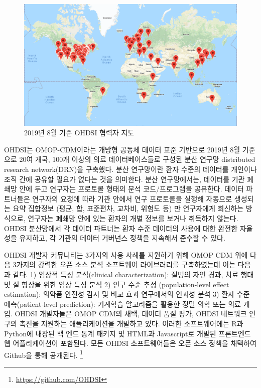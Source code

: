 \documentclass[11pt]{book}
\let\rmarkdownfootnote\footnote%
\def\footnote{\protect\rmarkdownfootnote}
\theoremstyle{definition}
\theoremstyle{definition}
\theoremstyle{definition}
\theoremstyle{remark}
\begin{document}
\begin{figure}

{\centering \includegraphics[width=1\linewidth]{images/OhdsiCommunity/mapOfCollaborators} 

}

\caption{2019년 8월 기준 OHDSI 협력자 지도}\label{fig:collaboratormap}
\end{figure}

OHDSI는 OMOP-CDM이라는 개방형 공동체 데이터 표준 기반으로 2019년 8월
기준으로 20여 개국, 100개 이상의 의료 데이터베이스들로 구성된 분산
연구망 distributed research network(DRN)을 구축했다. 분산 연구망이란
환자 수준의 데이터를 개인이나 조직 간에 공유할 필요가 없다는 것을
의미한다. 분산 연구망에서는, 데이터를 기관 폐쇄망 안에 두고 연구자는
프로토콜 형태의 분석 코드/프로그램을 공유한다. 데이터 파트너들은
연구자의 요청에 따라 기관 안에서 연구 프로토콜을 실행해 자동으로
생성되는 요약 집합정보 (평균, 합, 표준편차, 교차비, 위험도 등) 만
연구자에게 회신하는 방식으로, 연구자는 폐쇄망 안에 있는 환자의 개별
정보를 보거나 취득하지 않는다. OHDSI 분산망에서 각 데이터 파트너는 환자
수준 데이터의 사용에 대한 완전한 자율성을 유지하고, 각 기관의 데이터
거버넌스 정책을 지속해서 준수할 수 있다.

OHDSI 개발자 커뮤니티는 3가지의 사용 사례를 지원하기 위해 OMOP CDM 위에
다음 3가지의 강력한 오픈 소스 분석 소프트웨어 라이브러리를 구축하였는데
이는 다음과 같다. 1) 임상적 특성 분석(clinical characterization): 질병의
자연 경과, 치료 행태 및 질 향상을 위한 임상 특성 분석 2) 인구 수준 추정
(population-level effect estimation): 의약품 안전성 감시 및 비교 효과
연구에서의 인과성 분석 3) 환자 수준 예측(patient-level prediction):
기계학습 알고리즘을 활용한 정밀 의학 또는 의료 개입. OHDSI 개발자들은
OMOP CDM의 채택, 데이터 품질 평가, OHDSI 네트워크 연구의 촉진을 지원하는
애플리케이션을 개발하고 있다. 이러한 소프트웨어에는 R과 Python에 내장된
백 엔드 통계 패키지 및 HTML과 Javascript로 개발된 프론트엔드 웹
어플리케이션이 포함된다. 모든 OHDSI 소프트웨어들은 오픈 소스 정책을
채택하여 Github을 통해 공개된다. \footnote{\url{https://github.com/OHDSI}}
\end{document}
